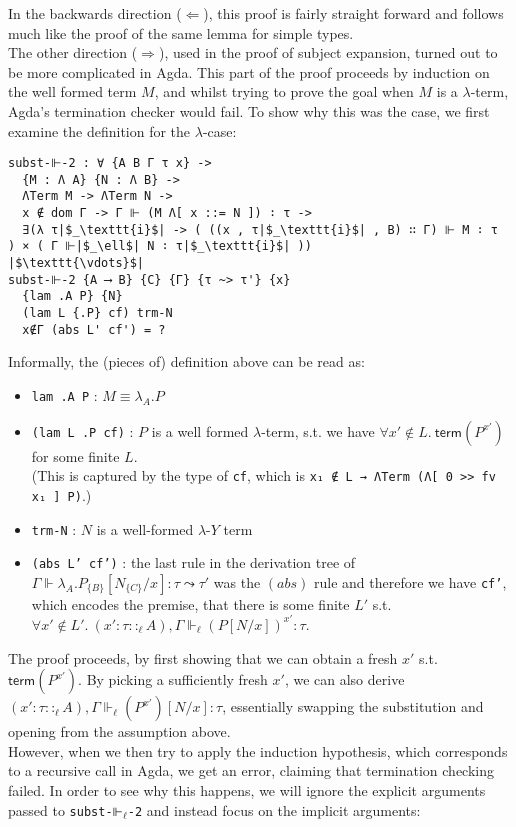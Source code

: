 \documentclass[a4paper, 12pt, twoside]{style/ociamthesis}
\theoremstyle{plain}
\theoremstyle{definition}
\theoremstyle{remark}
\providecommand{\tightlist}{%
  \setlength{\itemsep}{0pt}\setlength{\parskip}{0pt}}
\newcommand{\lamy}{\lambda\text{-}Y}
\newcommand{\trm}{\textsf{term}}
\begin{document}
In the backwards direction (\(\Leftarrow\)), this proof is fairly
straight forward and follows much like the proof of the same lemma for
simple types.\\
The other direction (\(\Rightarrow\)), used in the proof of subject
expansion, turned out to be more complicated in Agda. This part of the
proof proceeds by induction on the well formed term \(M\), and whilst
trying to prove the goal when \(M\) is a \(\lambda\)-term, Agda's
termination checker would fail. To show why this was the case, we first
examine the definition for the \(\lambda\)-case:

\begin{verbatim}
subst-⊩-2 : ∀ {A B Γ τ x} ->
  {M : Λ A} {N : Λ B} -> 
  ΛTerm M -> ΛTerm N ->
  x ∉ dom Γ -> Γ ⊩ (M Λ[ x ::= N ]) ∶ τ ->
  ∃(λ τ|$_\texttt{i}$| -> ( ((x , τ|$_\texttt{i}$| , B) ∷ Γ) ⊩ M ∶ τ ) × ( Γ ⊩|$_\ell$| N ∶ τ|$_\texttt{i}$| ))
|$\texttt{\vdots}$|
subst-⊩-2 {A ⟶ B} {C} {Γ} {τ ~> τ'} {x} 
  {lam .A P} {N} 
  (lam L {.P} cf) trm-N 
  x∉Γ (abs L' cf') = ?
\end{verbatim}

Informally, the (pieces of) definition above can be read as:

\begin{itemize}
\tightlist
\item
  \texttt{{lam .A P}} : \(M \equiv \lambda_A.P\)
\item
  \texttt{(lam L {.P} cf)} : \(P\) is a well formed \(\lambda\)-term,
  s.t. we have \(\forall x' \not\in L.\ \trm(P^{x'})\) for some finite
  \(L\).\\
  (This is captured by the type of \texttt{cf}, which is
  \texttt{x₁ ∉ L → ΛTerm (Λ[ 0 >> fv x₁ ] P)}.)
\item
  \texttt{trm-N} : \(N\) is a well-formed \(\lamy\) term
\item
  \texttt{(abs L' cf')} : the last rule in the derivation tree of
  \(\Gamma \Vdash \lambda_A.P_{\{B\}}[N_{\{C\}}/x] : \tau \leadsto \tau'\)
  was the \((abs)\) rule and therefore we have \texttt{cf'}, which
  encodes the premise, that there is some finite \(L'\) s.t.
  \(\forall x' \not\in L'.\ (x' : \tau ::_\ell A),\Gamma \Vdash_\ell (P[N/x])^{x'} : \tau\).
\end{itemize}

The proof proceeds, by first showing that we can obtain a fresh \(x'\)
s.t. \(\trm(P^{x'})\). By picking a sufficiently fresh \(x'\), we can
also derive
\((x' : \tau ::_\ell A),\Gamma \Vdash_\ell (P^{x'})[N/x] : \tau\),
essentially swapping the substitution and opening from the assumption
above.\\
However, when we then try to apply the induction hypothesis, which
corresponds to a recursive call in Agda, we get an error, claiming that
termination checking failed. In order to see why this happens, we will
ignore the explicit arguments passed to \texttt{subst-⊩$_\ell$-2} and
instead focus on the implicit arguments:
\end{document}
